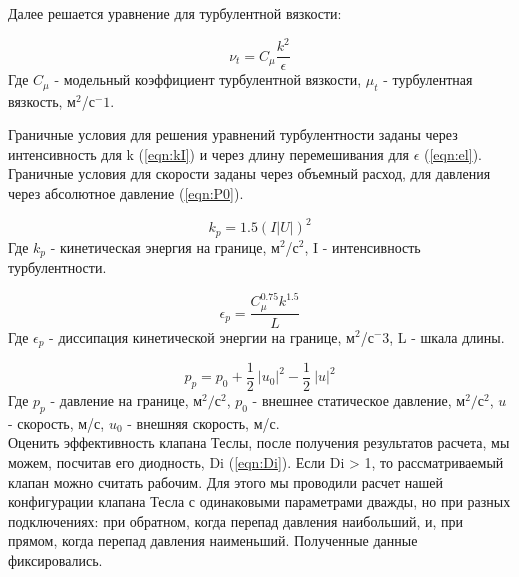 \documentclass[10pt,a4paper]{book}
\begin{document}
    Далее решается уравнение для турбулентной вязкости:
    
    \begin{equation}\label{eqn:mu}
        \nu_{t} = C_{\mu}\frac{k^2}{\epsilon}
    \end{equation} 
    Где $C_{\mu}$ - модельный коэффициент турбулентной вязкости, $\mu_{t}$ - турбулентная вязкость, м$^2$/с$^-1$.
    
    
    Граничные условия для решения уравнений турбулентности заданы через интенсивность для k (\ref{eqn:kI}) и через длину перемешивания для $\epsilon$ (\ref{eqn:el}). Граничные условия для скорости заданы через объемный расход, для давления через абсолютное давление (\ref{eqn:P0}).
    
    \begin{equation}\label{eqn:kI}
        k_{p} = 1.5 (I |U|)^2
    \end{equation}
    Где $k_{p}$ - кинетическая энергия на границе, м$^2$/с$^2$, I - интенсивность турбулентности.
    
    \begin{equation}\label{eqn:el}
        \epsilon_{p} = \frac{C_{\mu}^{0.75} k^{1.5}}{L}           
    \end{equation}
    Где $\epsilon_{p}$ - диссипация кинетической энергии на границе, м$^2$/с$^-3$, L - шкала длины.
    
    \begin{equation}\label{eqn:P0}
        p_{p} = p_{0} + \frac{1}{2}\ \left|u_{0}\right|^2 - \frac{1}{2}\ \left|u\right|^2
    \end{equation}
    Где $p_{p}$ - давление на границе, м$^{2}/$с$^{2}$, $p_{0}$ - внешнее статическое давление, м$^{2}/$с$^{2}$, $u$ - скорость, м/с, $u_{0}$ - внешняя скорость, м/с.\\
    
    Оценить эффективность клапана Теслы, после получения результатов расчета, мы можем, посчитав его диодность, Di (\ref{eqn:Di}). Если Di > 1, то рассматриваемый клапан можно считать рабочим. Для этого мы проводили расчет нашей конфигурации клапана Тесла с одинаковыми параметрами дважды, но при разных подключениях: при обратном, когда перепад давления наибольший, и, при прямом, когда перепад давления наименьший. Полученные данные фиксировались.         
    
\end{document}

